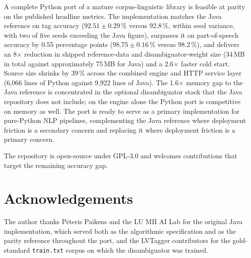 \documentclass[11pt,a4paper]{article}
\begin{document}
A complete Python port of a mature corpus-linguistic library is
feasible at parity on the published headline metrics. The
implementation matches the Java reference on tag accuracy
($92.51 \pm 0.29\,\%$ versus 92.8\,\%, within seed variance, with two
of five seeds exceeding the Java figure), surpasses it on
part-of-speech accuracy by 0.55 percentage points
($98.75 \pm 0.16\,\%$ versus 98.2\,\%), and delivers an
8$\times$ reduction in shipped reference-data and disambiguator-weight
size (34\,MB in total against approximately 75\,MB for Java) and a
2.6$\times$ faster cold start. Source size shrinks by 39\,\% across
the combined engine and HTTP service layer (6{,}066 lines of Python
against 9{,}922 lines of Java). The 1.6$\times$ memory gap to the
Java reference is concentrated in the optional disambiguator stack
that the Java repository does not include; on the engine alone the
Python port is competitive on memory as well. The port is ready to
serve as a primary implementation for pure-Python NLP pipelines,
complementing the Java reference where deployment friction is a
secondary concern and replacing it where deployment friction is a
primary concern.

The repository is open-source under GPL-3.0 and welcomes contributions
that target the remaining accuracy gap.

\section*{Acknowledgements}

The author thanks Pēteris Paikens and the LU MII AI Lab for the
original Java implementation, which served both as the algorithmic
specification and as the parity reference throughout the port, and
the LVTagger contributors for the gold-standard \texttt{train.txt}
corpus on which the disambiguator was trained.
\end{document}
